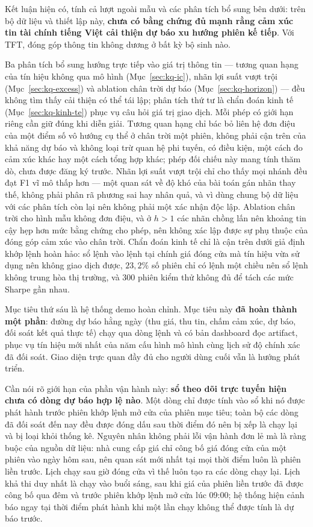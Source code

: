 Kết luận hiện có, tính cả lượt ngoài mẫu và các phân tích bổ sung bên dưới: trên
bộ dữ liệu và thiết lập này, \textbf{chưa có bằng chứng đủ mạnh rằng cảm xúc tin
tài chính tiếng Việt cải thiện dự báo xu hướng phiên kế tiếp}. Với TFT, đóng góp
thông tin không dương ở bất kỳ bộ sinh nào.

Ba phân tích bổ sung hướng trực tiếp vào giá trị thông tin --- tương quan hạng
của tín hiệu không qua mô hình (Mục~\ref{sec:kq-ic}), nhãn lợi suất vượt trội
(Mục~\ref{sec:kq-excess}) và ablation chân trời dự báo
(Mục~\ref{sec:kq-horizon}) --- đều không tìm thấy cải thiện có thể tái lập; phân
tích thứ tư là chẩn đoán kinh tế (Mục~\ref{sec:kq-kinh-te}) phục vụ câu hỏi
giá trị giao dịch. Mỗi phép có giới hạn riêng cần giữ đúng khi diễn giải. Tương quan
hạng chỉ bác bỏ liên hệ đơn điệu của một điểm số vô hướng cụ thể ở chân trời một
phiên, không phải cận trên của khả năng dự báo và không loại trừ quan hệ phi
tuyến, có điều kiện, một cách đo cảm xúc khác hay một cách tổng hợp khác; phép
đối chiếu này mang tính thăm dò, chưa được đăng ký trước. Nhãn lợi suất vượt
trội chỉ cho thấy mọi nhánh đều đạt F1 vĩ mô thấp hơn --- một quan sát về độ khó
của bài toán gán nhãn thay thế, không phải phân rã phương sai hay nhân quả, và
vì dùng chung bộ dữ liệu với các phân tích còn lại nên không phải một xác nhận
độc lập. Ablation chân trời cho hình mẫu không đơn điệu, và ở $h > 1$ các nhãn
chồng lấn nên khoảng tin cậy hẹp hơn mức bằng chứng cho phép, nên không xác lập
được sự phụ thuộc của đóng góp cảm xúc vào chân trời. Chẩn đoán kinh tế chỉ là
cận trên dưới giả định khớp lệnh hoàn hảo: sổ lệnh vào lệnh tại chính giá đóng
cửa mà tín hiệu vừa sử dụng nên không giao dịch được, $23{,}2\%$ số phiên chỉ có
lệnh một chiều nên sổ lệnh không trung hòa thị trường, và 300 phiên kiểm thử
không đủ để tách các mức Sharpe gần nhau.

Mục tiêu thứ sáu là hệ thống demo hoàn chỉnh. Mục tiêu này \textbf{đã hoàn thành một phần}:
đường dự báo hằng ngày (thu giá, thu tin, chấm cảm xúc, dự báo, đối soát kết quả thực tế)
chạy qua dòng lệnh và có bản dashboard đọc artifact, phục vụ tín hiệu mới nhất của năm cấu
hình mô hình cùng lịch sử độ chính xác đã đối soát. Giao diện trực quan đầy đủ cho người
dùng cuối vẫn là hướng phát triển.

Cần nói rõ giới hạn của phần vận hành này: \textbf{sổ theo dõi trực tuyến hiện chưa có dòng
dự báo hợp lệ nào}. Một dòng chỉ được tính vào sổ khi nó được phát hành trước phiên khớp
lệnh mở cửa của phiên mục tiêu; toàn bộ các dòng đã đối soát đến nay đều được đóng dấu sau
thời điểm đó nên bị xếp là chạy lại và bị loại khỏi thống kê. Nguyên nhân không phải lỗi
vận hành đơn lẻ mà là ràng buộc của nguồn dữ liệu: nhà cung cấp giá chỉ công bố giá đóng
cửa của một phiên vào ngày hôm sau, nên quan sát mới nhất tại mọi thời điểm luôn là phiên
liền trước. Lịch chạy sau giờ đóng cửa vì thế luôn tạo ra các dòng chạy lại. Lịch khả thi
duy nhất là chạy vào buổi sáng, sau khi giá của phiên liền trước đã được công bố qua đêm và
trước phiên khớp lệnh mở cửa lúc 09:00; hệ thống hiện cảnh báo ngay tại thời điểm phát hành
khi một lần chạy không thể được tính là dự báo trước.

